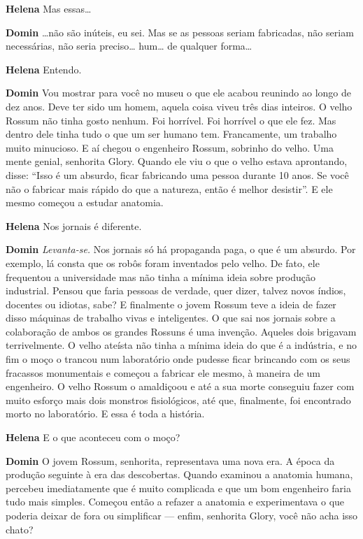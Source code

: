 \textbf{Helena} Mas essas\ldots{}

\textbf{Domin} \ldots{}não são inúteis, eu sei. Mas se as pessoas seriam fabricadas, não
seriam necessárias, não seria preciso\ldots{} hum\ldots{} de qualquer forma\ldots{}

\textbf{Helena} Entendo.

\textbf{Domin} Vou mostrar para você no museu o que ele acabou reunindo ao longo de
dez anos. Deve ter sido um homem, aquela coisa viveu três dias inteiros. O velho
Rossum não tinha gosto nenhum. Foi horrível. Foi horrível o que ele fez. Mas
dentro dele tinha tudo o que um ser humano tem. Francamente, um trabalho
muito minucioso. E aí chegou o engenheiro Rossum, sobrinho do velho. Uma mente
genial, senhorita Glory. Quando ele viu o que o velho estava aprontando, disse:
``Isso é um absurdo, ficar fabricando uma pessoa durante 10 anos. Se você não o
fabricar mais rápido do que a natureza, então é melhor desistir''.
E ele mesmo começou a estudar anatomia.

\textbf{Helena} Nos jornais é diferente.

\textbf{Domin} \emph{Levanta-se.} Nos jornais só há propaganda paga, o que é um
absurdo. Por exemplo, lá consta que os robôs foram inventados pelo velho. De
fato, ele frequentou a universidade mas não tinha a mínima ideia sobre produção
industrial. Pensou que faria pessoas de verdade, quer dizer, talvez novos
índios, docentes ou idiotas, sabe? E finalmente o jovem Rossum teve a ideia de
fazer disso máquinas de trabalho vivas e inteligentes. O que sai nos
jornais sobre a colaboração de ambos os grandes Rossuns é uma invenção.
Aqueles dois brigavam terrivelmente. O velho ateísta não tinha a mínima ideia do
que é a indústria, e no fim o moço o trancou num laboratório onde pudesse ficar
brincando com os seus fracassos monumentais e começou a fabricar ele mesmo, à maneira de um
engenheiro. O velho Rossum o amaldiçoou e até a sua morte conseguiu fazer com
muito esforço mais dois monstros fisiológicos, até que, finalmente, foi
encontrado morto no laboratório. E essa é toda a história.

\textbf{Helena} E o que aconteceu com o moço?

\textbf{Domin} O jovem Rossum, senhorita, representava uma nova era. A época da produção
seguinte à era das descobertas. Quando examinou a anatomia humana, percebeu
imediatamente que é muito complicada e que um bom engenheiro faria tudo mais
simples. Começou então a refazer a anatomia e experimentava o que poderia deixar
de fora ou simplificar --- enfim, senhorita Glory, você não acha isso chato?

